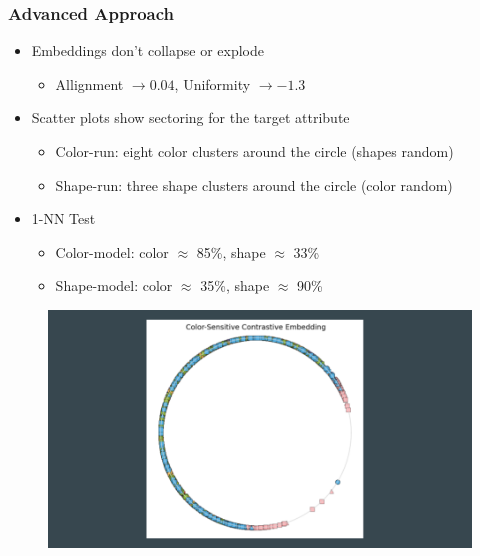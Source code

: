 \documentclass{article}
\begin{document}
\subsubsection{Advanced Approach}
\begin{itemize}
    \item Embeddings don't collapse or explode 
        \begin{itemize}
            \item Allignment $\rightarrow 0.04$, Uniformity $\rightarrow -1.3$
        \end{itemize}
    \item Scatter plots show sectoring for the target attribute
        \begin{itemize}
            \item Color-run: eight color clusters around the circle (shapes random)
            \item Shape-run: three shape clusters around the circle (color random)
        \end{itemize}
    \item 1-NN Test 
        \begin{itemize}
            \item Color-model: color $\approx$ 85\%, shape $\approx$ 33\%
            \item Shape-model: color $\approx$ 35\%, shape $\approx$ 90\%
        \end{itemize}
\end{itemize}
\begin{figure}[h]
    \centering
    \includegraphics[scale=0.25]{contrastive_color_sensitive}
    \caption{}
    \label{fig:contrastive_color_sensitive1}
\end{figure}
\end{document}
